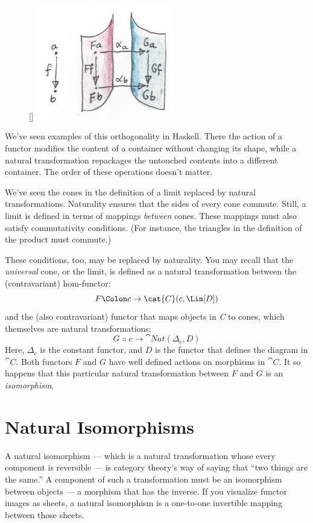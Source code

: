 \begin{figure}
\raisebox{0pt}[\dimexpr{}\baselineskip\relax]{
\includegraphics[width=60mm]{images/sheets.png}}%
\end{figure}

\noindent
We've seen examples of this orthogonality in Haskell. There the action
of a functor modifies the content of a container without changing its
shape, while a natural transformation repackages the untouched contents
into a different container. The order of these operations doesn't
matter.

We've seen the cones in the definition of a limit replaced by natural
transformations. Naturality ensures that the sides of every cone
commute. Still, a limit is defined in terms of mappings \emph{between}
cones. These mappings must also satisfy commutativity conditions. (For
instance, the triangles in the definition of the product must commute.)

These conditions, too, may be replaced by naturality. You may recall
that the \emph{universal} cone, or the limit, is defined as a natural
transformation between the (contravariant) hom-functor:
\[F \Colon c \to \cat{C}(c, \Lim[D])\]
and the (also contravariant) functor that maps objects in \emph{C} to
cones, which themselves are natural transformations:
\[G \Colon c \to \cat{Nat}(\Delta_c, D)\]
Here, $\Delta_c$ is the constant functor, and $D$ is the functor
that defines the diagram in $\cat{C}$. Both functors $F$ and
$G$ have well defined actions on morphisms in $\cat{C}$. It so
happens that this particular natural transformation between $F$
and $G$ is an \emph{isomorphism}.

\section{Natural Isomorphisms}

A natural isomorphism --- which is a natural transformation whose every
component is reversible --- is category theory's way of saying that
``two things are the same.'' A component of such a transformation must
be an isomorphism between objects --- a morphism that has the inverse.
If you visualize functor images as sheets, a natural isomorphism is a
one-to-one invertible mapping between those sheets.

